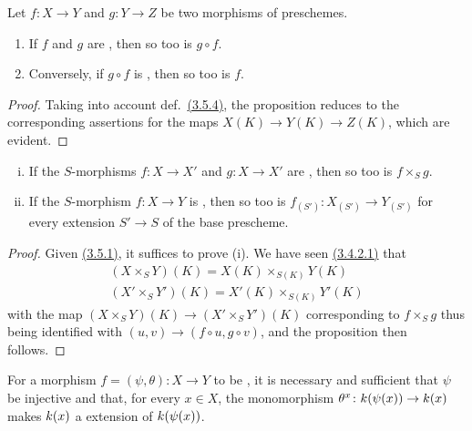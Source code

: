 \begin{prop}[3.5.6]
\label{prop-1.3.5.6}
Let $f\colon X\to Y$ and $g\colon Y\to Z$ be two morphisms of preschemes.
\begin{enumerate}
    \item If $f$ and $g$ are , then so too is $g\circ f$.
    \item Conversely, if $g\circ f$ is , then so too is $f$.
\end{enumerate}
\end{prop}

\begin{proof}
\label{proof-prop-1.3.5.6}
Taking into account def.~\hyperref[defn-1.3.5.4]{(3.5.4)}, the proposition reduces to the corresponding assertions for the maps $X(K)\to Y(K)\to Z(K)$, which are evident.
\end{proof}

\begin{prop}[3.5.7]
\label{prop-1.3.5.7}
\begin{enumerate}[(i)]
    \item If the $S$-morphisms $f\colon X\to X'$ and $g\colon X\to X'$ are , then so too is $f\times_S g$.
    \item If the $S$-morphism $f\colon X\to Y$ is , then so too is $f_{(S')}\colon X_{(S')}\to Y_{(S')}$ for every extension $S'\to S$ of the base prescheme.
\end{enumerate}
\end{prop}

\begin{proof}
\label{proof-prop-1.3.5.7}
Given \hyperref[env-1.3.5.1]{(3.5.1)}, it suffices to prove (i).
We have seen \hyperref[env-1.3.4.2]{(3.4.2.1)} that
\begin{gather*}
    (X\times_S Y)(K) = X(K)\times_{S(K)}Y(K)\\
    (X'\times_S Y')(K) = X'(K)\times_{S(K)}Y'(K)
\end{gather*}
with the map $(X\times_S Y)(K)\to(X'\times_S Y')(K)$ corresponding to $f\times_S g$ thus being identified with $(u,v)\to(f\circ u,g\circ v)$, and the proposition then follows.
\end{proof}

\begin{prop}[3.5.8]
\label{prop-1.3.5.8}
For a morphism $f=(\psi,\theta)\colon X\to Y$ to be , it is necessary and sufficient that $\psi$ be injective and that, for every $x\in X$, the monomorphism $\theta^x\colon k(\psi(x))\to k(x)$ makes $k(x)$ a  extension of $k(\psi(x))$.
\end{prop}

